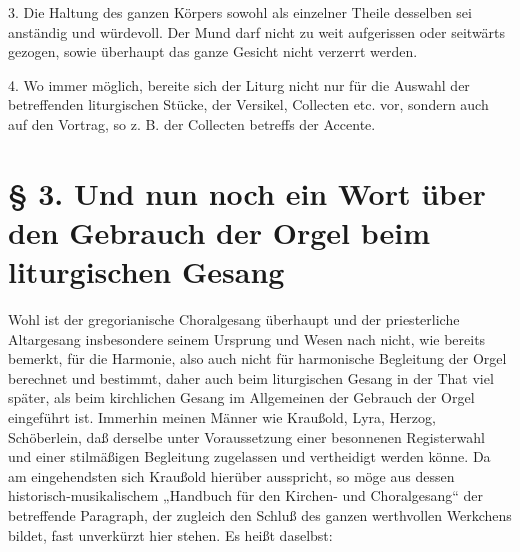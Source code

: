 3. Die Haltung des ganzen Körpers sowohl als einzelner Theile desselben sei anständig und würdevoll. Der Mund darf nicht zu weit aufgerissen oder seitwärts gezogen, sowie überhaupt das ganze Gesicht nicht verzerrt werden.

4. Wo immer möglich, bereite sich der Liturg nicht nur für die Auswahl der betreffenden liturgischen Stücke, der Versikel, Collecten etc. vor, sondern auch auf den Vortrag, so z. B. der Collecten betreffs der Accente.

\section[§ 3. Gebrauch der Orgel]{§ 3. Und nun noch ein Wort über den Gebrauch der Orgel beim liturgischen Gesang}


Wohl ist der gregorianische Choralgesang überhaupt und der priesterliche Altargesang insbesondere seinem Ursprung und Wesen nach nicht, wie bereits bemerkt, für die Harmonie, also auch nicht für harmonische Begleitung der Orgel berechnet und bestimmt, daher auch beim liturgischen Gesang in der That viel später, als beim kirchlichen Gesang im Allgemeinen der Gebrauch der Orgel eingeführt ist. Immerhin meinen Männer wie Kraußold, Lyra, Herzog, Schöberlein, daß derselbe unter Voraussetzung einer besonnenen Registerwahl und einer stilmäßigen Begleitung zugelassen und vertheidigt werden könne. Da am eingehendsten sich Kraußold hierüber ausspricht, so möge aus dessen historisch-musikalischem „Handbuch für den Kirchen- und Choralgesang“ der betreffende
Paragraph, der zugleich den Schluß des ganzen werthvollen Werkchens bildet, fast unverkürzt hier stehen. Es heißt daselbst:

